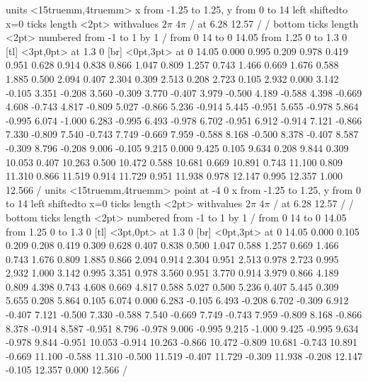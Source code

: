 \figure
\vbox{\beginpicture
\normalgraphs
\ninepoint
\setcoordinatesystem units <15truemm,4truemm>
\setplotarea x from -1.25 to 1.25, y from 0 to 14
\axis left shiftedto x=0 ticks length <2pt> withvalues {$2\pi$} {$4\pi$} /
  at 6.28 12.57 / /
\axis bottom ticks length <2pt> numbered from -1 to 1 by 1 /
\arrow <4pt> [0.35, 1] from 0 14 to 0 14.05
\arrow <4pt> [0.35, 1] from 1.25 0 to 1.3 0
 [tl] <3pt,0pt> at 1.3 0 
 [br] <0pt,3pt> at 0 14.05 
 0.000 0.995 0.209 0.978 0.419 0.951 0.628 0.914 0.838 0.866
1.047 0.809 1.257 0.743 1.466 0.669 1.676 0.588 1.885 0.500 2.094
0.407 2.304 0.309 2.513 0.208 2.723 0.105 2.932 0.000 3.142 -0.105
3.351 -0.208 3.560 -0.309 3.770 -0.407 3.979 -0.500 4.189 -0.588 4.398
-0.669 4.608 -0.743 4.817 -0.809 5.027 -0.866 5.236 -0.914 5.445
-0.951 5.655 -0.978 5.864 -0.995 6.074 -1.000 6.283 -0.995 6.493
-0.978 6.702 -0.951 6.912 -0.914 7.121 -0.866 7.330 -0.809 7.540
-0.743 7.749 -0.669 7.959 -0.588 8.168 -0.500 8.378 -0.407 8.587
-0.309 8.796 -0.208 9.006 -0.105 9.215 0.000 9.425 0.105 9.634 0.208
9.844 0.309 10.053 0.407 10.263 0.500 10.472 0.588 10.681 0.669 10.891
0.743 11.100 0.809 11.310 0.866 11.519 0.914 11.729 0.951 11.938 0.978
12.147 0.995 12.357 1.000 12.566 /
\setcoordinatesystem units <15truemm,4truemm> point at -4 0
\setplotarea x from -1.25 to 1.25, y from 0 to 14
\axis left shiftedto x=0 ticks length <2pt>  withvalues {$2\pi$} {$4\pi$} /
  at 6.28 12.57 / /
\axis bottom ticks length <2pt> numbered from -1 to 1 by 1 /
\arrow <4pt> [0.35, 1] from 0 14 to 0 14.05
\arrow <4pt> [0.35, 1] from 1.25 0 to 1.3 0
 [tl] <3pt,0pt> at 1.3 0 
 [br] <0pt,3pt> at 0 14.05 
 0.000 0.105 0.209 0.208 0.419 0.309 0.628 0.407 0.838 0.500
 1.047 0.588 1.257 0.669 1.466 0.743 1.676 0.809 1.885 0.866 2.094
 0.914 2.304 0.951 2.513 0.978 2.723 0.995 2.932 1.000 3.142 0.995
 3.351 0.978 3.560 0.951 3.770 0.914 3.979 0.866 4.189 0.809 4.398
 0.743 4.608 0.669 4.817 0.588 5.027 0.500 5.236 0.407 5.445 0.309
 5.655 0.208 5.864 0.105 6.074 0.000 6.283 -0.105 6.493 -0.208 6.702
 -0.309 6.912 -0.407 7.121 -0.500 7.330 -0.588 7.540 -0.669 7.749
 -0.743 7.959 -0.809 8.168 -0.866 8.378 -0.914 8.587 -0.951 8.796
 -0.978 9.006 -0.995 9.215 -1.000 9.425 -0.995 9.634 -0.978 9.844
 -0.951 10.053 -0.914 10.263 -0.866 10.472 -0.809 10.681 -0.743 10.891
 -0.669 11.100 -0.588 11.310 -0.500 11.519 -0.407 11.729 -0.309 11.938
 -0.208 12.147 -0.105 12.357 0.000 12.566 /
\endpicture}

